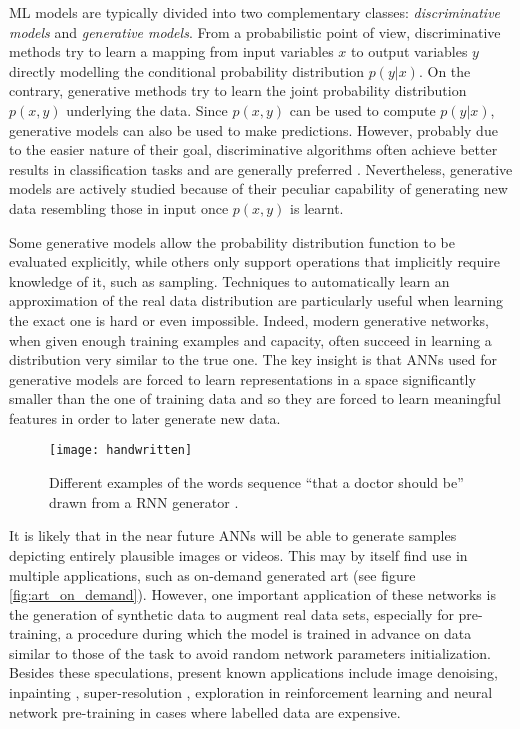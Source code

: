ML models are typically divided into two complementary classes: \textit{discriminative models} and \textit{generative models}. From a probabilistic point of view, discriminative methods try to learn a mapping from input variables $x$ to output variables $y$ directly modelling the conditional probability distribution $p(y|x)$. On the contrary, generative methods try to learn the joint probability distribution $p(x, y)$ underlying the data. Since $p(x, y)$ can be used to compute $p(y|x)$, generative models can also be used to make predictions. However, probably due to the easier nature of their goal, discriminative algorithms often achieve better results in classification tasks and are generally preferred \cite{disc_vs_gen}. Nevertheless, generative models are actively studied because of their peculiar capability of generating new data resembling those in input once $p(x, y)$ is learnt.

Some generative models allow the probability distribution function to be evaluated explicitly, while others only support operations that implicitly require knowledge of it, such as sampling. Techniques to automatically learn an approximation of the real data distribution are particularly useful when learning the exact one is hard or even impossible. Indeed, modern generative networks, when given enough training examples and capacity, often succeed in learning a distribution very similar to the true one. The key insight is that ANNs used for generative models are forced to learn representations in a space significantly smaller than the one of training data and so they are forced to learn meaningful features in order to later generate new data.

\begin{figure}[ht]
\centering
\texttt{[image: handwritten]}
\caption{Different examples of the words sequence ``that a doctor should be'' drawn from a RNN generator \cite{handwritten_rnn}.}
\end{figure}

It is likely that in the near future ANNs will be able to generate samples depicting entirely plausible images or videos. This may by itself find use in multiple applications, such as on-demand generated art \cite{igan} \cite{furniture} (see figure \ref{fig:art_on_demand}). However, one important application of these networks is the generation of synthetic data to augment real data sets, especially for pre-training, a procedure during which the model is trained in advance on data similar to those of the task to avoid random network parameters initialization.
Besides these speculations, present known applications include image denoising, inpainting \cite{inpainting}, super-resolution \cite{growing_gans} \cite{super_gans}, exploration in reinforcement learning and neural network pre-training in cases where labelled data are expensive.

